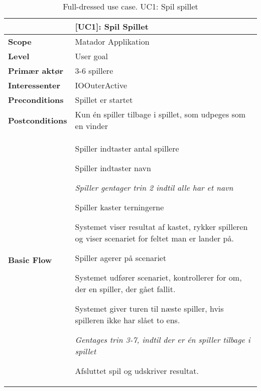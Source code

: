 \documentclass[class=article, crop=false]{standalone}
\makeatletter
\let\savespace\@minipagetrue
\makeatother
\begin{document}
    \begin{table}[H]
        \caption{Full-dressed use case. UC1: Spil spillet}
        \begin{tabularx}{\textwidth}{|l|X|}
            \hline
                                         & \textbf{[UC1]: Spil Spillet}   \\ \hline
            \textbf{Scope}               & Matador Applikation\\ \hline
            \textbf{Level}               & User goal     \\ \hline
            \textbf{Primær aktør}        & 3-6 spillere  \\ \hline
            \textbf{Interessenter}       & IOOuterActive\\ \hline
            \textbf{Preconditions}       & Spillet er startet \\ \hline
            \textbf{Postconditions}      & Kun én spiller tilbage i spillet,
                                           som udpeges som en vinder\\ \hline





            \textbf{Basic Flow} & \begin{tabenum}
                          \item Spiller indtaster antal spillere
                          \item Spiller indtaster navn
                              \savespace
                                \begin{compactitem}
                                    \item \textit{Spiller gentager trin 2                                                             indtil alle har et navn}
                          \end{compactitem}
                              \item Spiller kaster terningerne
                              \item Systemet viser resultat af kastet, rykker spilleren og viser scenariet for feltet man er lander på.
                              \item Spiller agerer på scenariet
                              \item Systemet udfører scenariet, kontrollerer for om, der en spiller, der gået fallit.
                          \item Systemet giver turen til næste spiller, hvis spilleren ikke har slået to ens.
                          \savespace
                          \begin{compactitem}
                              \item \textit{Gentages trin 3-7, indtil der er én spiller tilbage i spillet}
                          \end{compactitem}
                              \item Afsluttet spil og udskriver resultat.
                           \end{tabenum}   \\ \hline





\end{tabularx}
\end{table}
\end{document}
